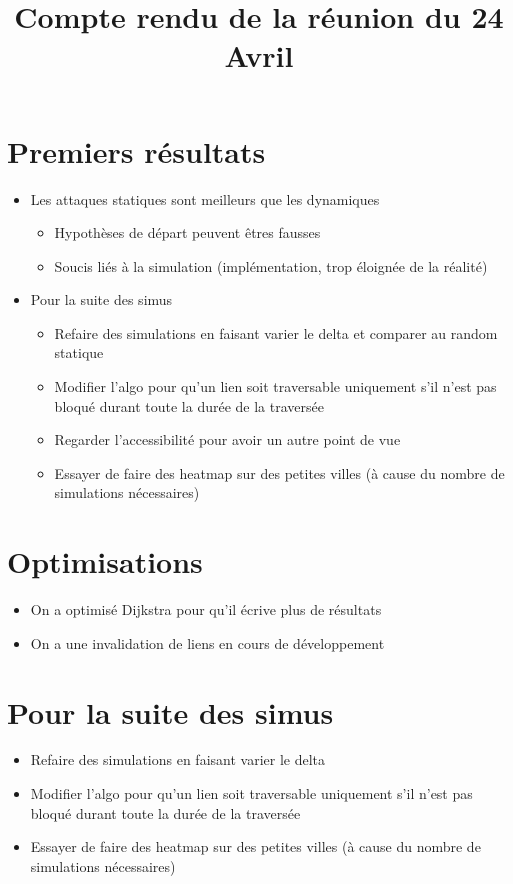 \documentclass{article}
\title{Compte rendu de la réunion du 24 Avril}
\date{}
\begin{document}
	
\maketitle
	
\section*{Premiers résultats}
	\begin{itemize}
		\item Les attaques statiques sont meilleurs que les dynamiques
		\begin{itemize}
			\item[$\rightarrow$] Hypothèses de départ peuvent êtres fausses
			\item[$\rightarrow$] Soucis liés à la simulation (implémentation, trop éloignée de la réalité)
		\end{itemize}
		\item Pour la suite des simus
		\begin{itemize}
			\item Refaire des simulations en faisant varier le delta et comparer au random statique
			\item Modifier l'algo pour qu'un lien soit traversable uniquement s'il n'est pas bloqué durant toute la durée de la traversée
			\item Regarder l'accessibilité pour avoir un autre point de vue
			\item Essayer de faire des heatmap sur des petites villes (à cause du nombre de simulations nécessaires)
		\end{itemize}		
	\end{itemize}
	
\section*{Optimisations}
	\begin{itemize}
		\item On a optimisé Dijkstra pour qu'il écrive plus de résultats
		\item On a une invalidation de liens en cours de développement
	\end{itemize}

	
\section*{Pour la suite des simus}
	\begin{itemize}
		\item Refaire des simulations en faisant varier le delta
		\item Modifier l'algo pour qu'un lien soit traversable uniquement s'il n'est pas bloqué durant toute la durée de la traversée
		\item Essayer de faire des heatmap sur des petites villes (à cause du nombre de simulations nécessaires)
	\end{itemize}
\end{document}
